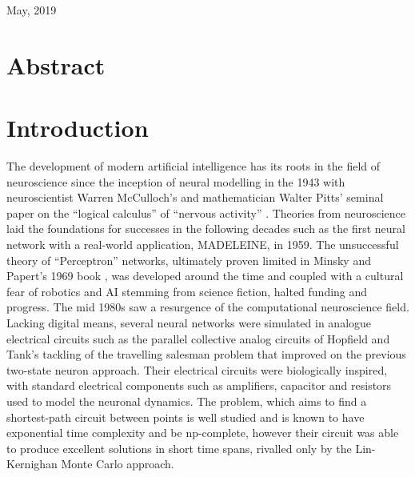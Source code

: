 \documentclass[11pt, twocolumn]{article}
\begin{document}
\begin{titlepage}
		
		\vfill\vfill\vfill %
		
		{\large May, 2019} %
		
		
		
		
		\vfill %
		
	\end{titlepage}

\newpage
\tableofcontents
\printacronyms[name=Acronyms]
\newpage


\twocolumn
\section*{Abstract}

\section*{Introduction}
The development of modern artificial intelligence has its roots in the field of neuroscience since the inception of neural modelling in the 1943 with neuroscientist Warren McCulloch's and mathematician Walter Pitts' seminal paper on the ``logical calculus'' of ``nervous activity'' \cite{mcculloch1943logical}. Theories from neuroscience laid the foundations for successes in the following decades such as the first neural network with a real-world application, MADELEINE, in 1959. The unsuccessful theory of ``Perceptron'' networks, ultimately proven limited in Minsky and Papert's 1969 book \cite{minsky1969perceptron}, was developed around the time and coupled with a cultural fear of robotics and AI stemming from science fiction, halted funding and progress. The mid 1980s saw a resurgence of the computational neuroscience field. Lacking digital means, several neural networks were simulated in analogue electrical circuits such as the parallel collective analog circuits of Hopfield and Tank's tackling of the travelling salesman problem \cite{hopfield1985neural} that improved on the previous two-state neuron approach. Their electrical circuits were biologically inspired, with standard electrical components such as amplifiers, capacitor and resistors used to model the neuronal dynamics. The problem, which aims to find a shortest-path circuit between points is well studied and is known to have exponential time complexity and be np-complete, however their circuit was able to produce excellent solutions in short time spans, rivalled only by the Lin-Kernighan Monte Carlo approach.
\end{document}
